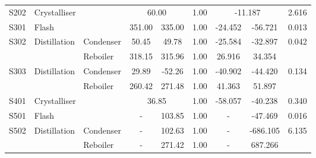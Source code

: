 \begin{table}[H]
\begin{tabular}{cllccccccc}
S202                  & \multicolumn{2}{l}{Crystalliser}                   & \multicolumn{2}{c}{60.00}                     & 1.00                    & \multicolumn{2}{c}{-11.187}                 & \multicolumn{2}{c}{2.616}                  \\
S301                  & \multicolumn{2}{l}{Flash}                          & 351.00                & 335.00                & 1.00                    & -24.452              & -56.721              & \multicolumn{2}{c}{0.013}                  \\
\multirow{2}{*}{S302} & \multirow{2}{*}{Distillation}      & Condenser     & 50.45                 & 49.78                 & 1.00                    & -25.584              & -32.897              & \multicolumn{2}{c}{\multirow{2}{*}{0.042}} \\
                      &                                    & Reboiler      & 318.15                & 315.96                & 1.00                    & 26.916               & 34.354               & \multicolumn{2}{c}{}         \\
\multirow{2}{*}{S303} & \multirow{2}{*}{Distillation}      & Condenser     & 29.89                 & -52.26                & 1.00                    & -40.902              & -44.420              & \multicolumn{2}{c}{\multirow{2}{*}{0.134}} \\
                      &                                    & Reboiler      & 260.42                & 271.48                & 1.00                    & 41.363               & 51.897               & \multicolumn{2}{c}{}         \\
S401                  & \multicolumn{2}{l}{Crystalliser}                   & \multicolumn{2}{c}{36.85}                     & 1.00                    & -58.057              & -40.238              & \multicolumn{2}{c}{0.340}                  \\
S501                  & \multicolumn{2}{l}{Flash}                          & -                     & 103.85                & 1.00                    & -                    & -47.469              & \multicolumn{2}{c}{0.016}                  \\
\multirow{2}{*}{S502} & \multirow{2}{*}{Distillation}      & Condenser     & -                     & 102.63                & 1.00                    & -                    & -686.105             & \multicolumn{2}{c}{\multirow{2}{*}{6.135}} \\
                      &                                    & Reboiler      & -                     & 271.42                & 1.00                    & -                    & 687.266              & \multicolumn{2}{c}{}         \\

\end{tabular}
\end{table}

